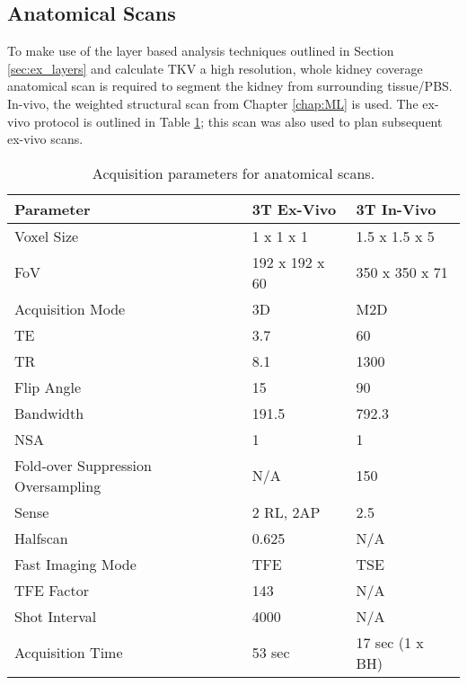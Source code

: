 \subsection{Anatomical Scans}

To make use of the layer based analysis techniques outlined in Section \ref{sec:ex_layers} and calculate \ac{TKV} a high resolution, whole kidney coverage anatomical scan is required to segment the kidney from surrounding tissue/\ac{PBS}. In-vivo, the \ttwo weighted structural scan from Chapter \ref{chap:ML} is used. The ex-vivo protocol is outlined in Table \ref{tab:ex_anatomical}; this scan was also used to plan subsequent ex-vivo scans.

\begin{table}[H]
	\centering
	\begin{tabularx}{1.0\textwidth}{|X|X|X|}
		\hline
		Parameter                          & 3T Ex-Vivo     & 3T In-Vivo      \\ \hline
		Voxel Size                         & 1 x 1 x 1      & 1.5 x 1.5 x 5   \\ \hline
		FoV                                & 192 x 192 x 60 & 350 x 350 x 71  \\ \hline
		Acquisition Mode                   & 3D             & M2D             \\ \hline
		TE                                 & 3.7            & 60              \\ \hline
		TR                                 & 8.1            & 1300            \\ \hline
		Flip Angle                         & 15             & 90              \\ \hline
		Bandwidth                          & 191.5          & 792.3           \\ \hline
		NSA                                & 1              & 1               \\ \hline
		Fold-over Suppression Oversampling & N/A            & 150             \\ \hline
		Sense                              & 2 RL, 2AP      & 2.5             \\ \hline
		Halfscan                           & 0.625          & N/A             \\ \hline
		Fast Imaging Mode                  & TFE            & TSE             \\ \hline
		TFE Factor                         & 143            & N/A             \\ \hline
		Shot Interval                      & 4000           & N/A             \\ \hline
		Acquisition Time                   & 53 sec         & 17 sec (1 x BH) \\ \hline
	\end{tabularx}
	\caption{Acquisition parameters for anatomical scans.}
	\label{tab:ex_anatomical}
\end{table}

